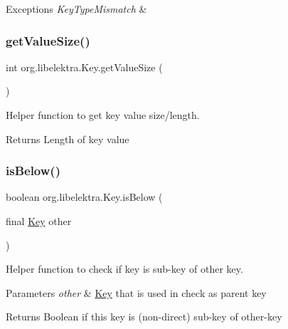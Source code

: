 \begin{DoxyExceptions}{Exceptions}
{\em Key\+Type\+Mismatch} & \\
\hline
\end{DoxyExceptions}
\mbox{\label{classorg_1_1libelektra_1_1Key_aeb1c3e899a17778c8511a08ee0472e43}} 
\subsubsection{\texorpdfstring{get\+Value\+Size()}{getValueSize()}}
{\footnotesize\ttfamily int org.\+libelektra.\+Key.\+get\+Value\+Size (\begin{DoxyParamCaption}{ }\end{DoxyParamCaption})\hspace{0.3cm}{\ttfamily [inline]}}



Helper function to get key value size/length. 

\begin{DoxyReturn}{Returns}
Length of key value 
\end{DoxyReturn}
\mbox{\label{classorg_1_1libelektra_1_1Key_af9a7a7941c07c058f1d4bd6c55e20fe9}} 
\subsubsection{\texorpdfstring{is\+Below()}{isBelow()}}
{\footnotesize\ttfamily boolean org.\+libelektra.\+Key.\+is\+Below (\begin{DoxyParamCaption}\item[{final \hyperlink{classorg_1_1libelektra_1_1Key}{Key}}]{other }\end{DoxyParamCaption})\hspace{0.3cm}{\ttfamily [inline]}}



Helper function to check if key is sub-\/key of other key. 


\begin{DoxyParams}{Parameters}
{\em other} & \hyperlink{classorg_1_1libelektra_1_1Key}{Key} that is used in check as parent key \\
\hline
\end{DoxyParams}
\begin{DoxyReturn}{Returns}
Boolean if this key is (non-\/direct) sub-\/key of other-\/key 
\end{DoxyReturn}
\mbox{\label{classorg_1_1libelektra_1_1Key_ab3143b14824a384ec4b6f9005f6da554}} 
